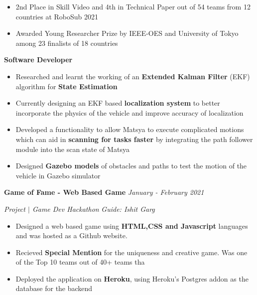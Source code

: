 \documentclass[a4paper,11pt]{article}
\begin{document}
\begin{itemize}[itemsep = -1.0mm, leftmargin = 0.2in]
\item 2nd Place in Skill Video and 4th in Technical Paper out of 54 teams from 12 countries at RoboSub 2021
\item Awarded Young Researcher Prize by IEEE-OES and University of Tokyo among 23 finalists of 18 countries
\end{itemize}
\vspace{-5pt}
\hspace{1pt} \textbf{Software Developer}
\vspace{-5pt}
\begin{itemize}[itemsep = -1.0mm, leftmargin = 0.2in]

\item Researched and learnt the working of an \textbf{Extended Kalman Filter} (EKF) algorithm for \textbf{State Estimation}
\item Currently designing an EKF based \textbf{localization system} to better incorporate the physics of the vehicle and improve accuracy of localization
\item Developed a functionality to allow Matsya to execute complicated motions which can aid in \textbf{scanning for tasks faster} by integrating the path follower module into the scan state of Matsya
\item Designed \textbf{Gazebo models} of obstacles and paths to test the motion of the vehicle in Gazebo simulator

\end{itemize}




\textbf{\large Game of Fame - Web Based Game}
\hfill\textit{\small January - February 2021}

\vspace{-1pt}
\textit{ Project $\vert$ Game Dev Hackathon}
\hfill\textit{\small Guide: Ishit Garg}

\vspace{-10pt}
\begin{itemize}[itemsep = -1.0mm, leftmargin = 0.2in]
\item Designed a web based game using \textbf{HTML,CSS and Javascript} languages and was hosted as a Github website. 
\item Recieved \textbf{Special Mention} for the uniqueness and creative game. Was one of the Top 10 teams out of 40+ teams tha 
\item Deployed the application on \textbf{Heroku}, using Heroku's Postgres addon as the database for the backend
\end{itemize}
\end{document}
